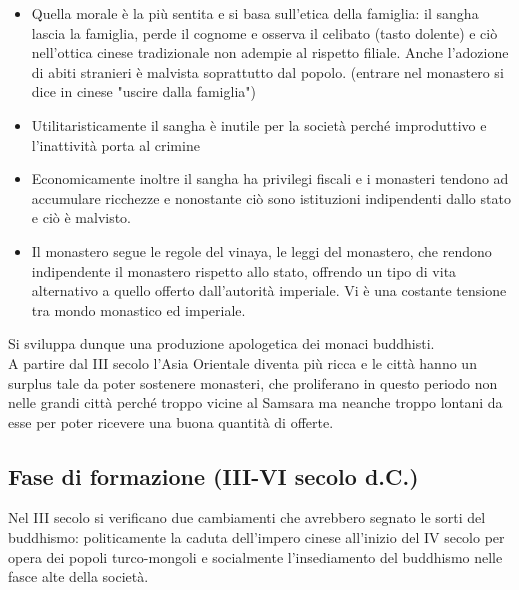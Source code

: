 \documentclass[10pt,a4paper]{report}
\begin{document}
\begin{itemize}
	\item Quella morale è la più sentita e si basa sull'etica della famiglia: il sangha lascia la famiglia, perde il cognome e osserva il celibato (tasto dolente) e ciò nell'ottica cinese tradizionale non adempie al rispetto filiale. Anche l'adozione di abiti stranieri è malvista soprattutto dal popolo. (entrare nel monastero si dice in cinese "uscire dalla famiglia")
	\item Utilitaristicamente il sangha è inutile per la società perché improduttivo e l'inattività porta al crimine
	\item Economicamente inoltre il sangha ha privilegi fiscali e i monasteri tendono ad accumulare ricchezze e nonostante ciò sono istituzioni indipendenti dallo stato e ciò è malvisto. 
	\item Il monastero segue le regole del vinaya, le leggi del monastero, che rendono indipendente il monastero rispetto allo stato, offrendo un tipo di vita alternativo a quello offerto dall'autorità imperiale. Vi è una costante tensione tra mondo monastico ed imperiale. 
\end{itemize}
Si sviluppa dunque una produzione apologetica dei monaci buddhisti.\\
A partire dal III secolo l'Asia Orientale diventa più ricca e le città hanno un surplus tale da poter sostenere monasteri, che proliferano in questo periodo non nelle grandi città perché troppo vicine al Samsara ma neanche troppo lontani da esse per poter ricevere una buona quantità di offerte. 

\subsection{Fase di formazione (III-VI secolo d.C.)}
Nel III secolo si verificano due cambiamenti che avrebbero segnato le sorti del buddhismo: politicamente la caduta dell'impero cinese all'inizio del IV secolo per opera dei popoli turco-mongoli e socialmente l'insediamento del buddhismo nelle fasce alte della società.
\end{document}
